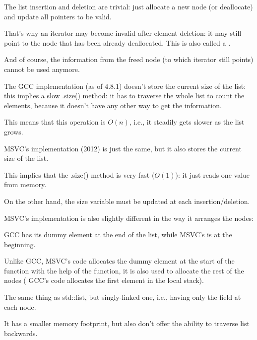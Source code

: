 The list insertion and deletion are trivial: just allocate a new node (or deallocate) and update all pointers
to be valid.

That's why an iterator may become invalid after element deletion: 
it may still point to the node that has been already deallocated.
This is also called a .

And of course, the information from the freed node (to which iterator still points) 
cannot be used anymore.

The GCC implementation (as of 4.8.1) doesn't store the current size of the list: this implies a slow .size() method:
it has to traverse the whole list to count the elements, because it doesn't have any other way to get the information.

This means that this operation is $O(n)$, i.e., it steadily gets slower as the list grows.





\label{MSVC_std_list}

MSVC's implementation (2012) is just the same, but it also stores the current size of the list.

This implies that the .size() method is very fast ($O(1)$): it just reads one value from memory.

On the other hand, the size variable must be updated at each insertion/deletion.

MSVC's implementation is also slightly different in the way it arranges the nodes:



GCC has its dummy element at the end of the list, while MSVC's is at the beginning.



Unlike GCC, MSVC's code allocates the dummy element at the start of the function with the help of the  function,
it is also used to allocate the rest of the nodes (
GCC's code allocates the first element in the local stack).




The same thing as std::list, but singly-linked one, i.e., having only the  field at each node.

It has a smaller memory footprint, but also don't offer the ability to traverse list backwards.

